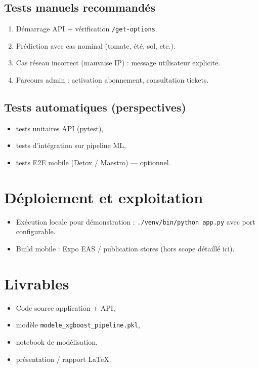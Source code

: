 \documentclass[12pt,a4paper,twoside,openright]{report}
\begin{document}
\subsection{Tests manuels recommandés}
\begin{enumerate}
  \item Démarrage API + vérification \texttt{/get-options}.
  \item Prédiction avec cas nominal (tomate, été, sol, etc.).
  \item Cas réseau incorrect (mauvaise IP) : message utilisateur explicite.
  \item Parcours admin : activation abonnement, consultation tickets.
\end{enumerate}

\subsection{Tests automatiques (perspectives)}
\begin{itemize}
  \item tests unitaires API (pytest),
  \item tests d'intégration sur pipeline ML,
  \item tests E2E mobile (Detox / Maestro) — optionnel.
\end{itemize}

\section{Déploiement et exploitation}

\begin{itemize}
  \item Exécution locale pour démonstration : \texttt{./venv/bin/python app.py} avec port configurable.
  \item Build mobile : Expo EAS / publication stores (hors scope détaillé ici).
\end{itemize}

\section{Livrables}

\begin{itemize}
  \item Code source application + API,
  \item modèle \texttt{modele\_xgboost\_pipeline.pkl},
  \item notebook de modélisation,
  \item présentation / rapport LaTeX.
\end{itemize}
\end{document}
